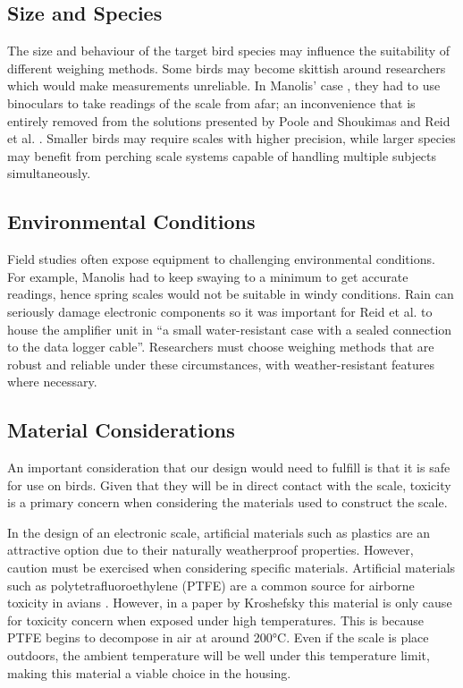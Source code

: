 \documentclass[class=report,11pt,crop=false]{standalone}
\begin{document}
\subsection{Size and Species}
The size and behaviour of the target bird species may influence the suitability of different weighing methods. Some birds may become skittish around researchers which would make measurements unreliable. In Manolis’ case \cite{manoils2024simple}, they had to use binoculars to take readings of the scale from afar; an inconvenience that is entirely removed from the solutions presented by Poole and Shoukimas \cite{poole1982scale} and Reid et al. \cite{reid1999measurement}. Smaller birds may require scales with higher precision, while larger species may benefit from perching scale systems capable of handling multiple subjects simultaneously.

\subsection{Environmental Conditions}
Field studies often expose equipment to challenging environmental conditions. For example, Manolis \cite{manoils2024simple} had to keep swaying to a minimum to get accurate readings, hence spring scales would not be suitable in windy conditions. Rain can seriously damage electronic components so it was important for Reid et al. \cite{reid1999measurement} to house the amplifier unit in “a small water-resistant case with a sealed connection to the data logger cable”. Researchers must choose weighing methods that are robust and reliable under these circumstances, with weather-resistant features where necessary.

\subsection{Material Considerations}
An important consideration that our design would need to fulfill is that it is safe for use on birds. Given that they will be in direct contact with the scale, toxicity is a primary concern when considering the materials used to construct the scale.

In the design of an electronic scale, artificial materials such as plastics are an attractive option due to their naturally weatherproof properties. However, caution must be exercised when considering specific materials. Artificial materials such as polytetrafluoroethylene (PTFE) are a common source for airborne toxicity in avians \cite{LightfootToxicity}. However, in a paper by Kroshefsky \cite{KroshefskyTeflon} this material is only cause for toxicity concern when exposed under high temperatures. This is because PTFE begins to decompose in air at around 200°C. Even if the scale is place outdoors, the ambient temperature will be well under this temperature limit, making this material a viable choice in the housing.
\end{document}
